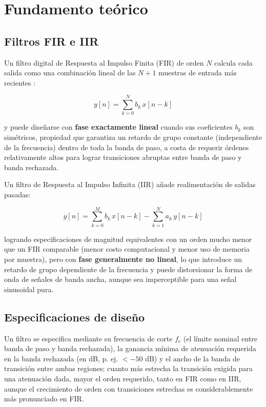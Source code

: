
\section{Fundamento teórico}

\subsection{Filtros FIR e IIR}

Un filtro digital de Respuesta al Impulso Finita (FIR) de orden $N$ calcula cada salida como una combinación lineal de las $N+1$ muestras de entrada más recientes \cite{oppenheim}:

\begin{equation}
y[n] = \sum_{k=0}^{N} b_k \, x[n-k]
\end{equation}

y puede diseñarse con \textbf{fase exactamente lineal} cuando sus coeficientes $b_k$ son simétricos, propiedad que garantiza un retardo de grupo constante (independiente de la frecuencia) dentro de toda la banda de paso, a costa de requerir órdenes relativamente altos para lograr transiciones abruptas entre banda de paso y banda rechazada.

Un filtro de Respuesta al Impulso Infinita (IIR) añade realimentación de salidas pasadas:

\begin{equation}
y[n] = \sum_{k=0}^{M} b_k \, x[n-k] - \sum_{k=1}^{N} a_k \, y[n-k]
\end{equation}

logrando especificaciones de magnitud equivalentes con un orden mucho menor que un FIR comparable (menor costo computacional y menor uso de memoria por muestra), pero con \textbf{fase generalmente no lineal}, lo que introduce un retardo de grupo dependiente de la frecuencia y puede distorsionar la forma de onda de señales de banda ancha, aunque sea imperceptible para una señal sinusoidal pura.

\subsection{Especificaciones de diseño}

Un filtro se especifica mediante su frecuencia de corte $f_c$ (el límite nominal entre banda de paso y banda rechazada), la ganancia mínima de atenuación requerida en la banda rechazada (en dB, p. ej. $< -50$ dB) y el ancho de la banda de transición entre ambas regiones; cuanto más estrecha la transición exigida para una atenuación dada, mayor el orden requerido, tanto en FIR como en IIR, aunque el crecimiento de orden con transiciones estrechas es considerablemente más pronunciado en FIR.

